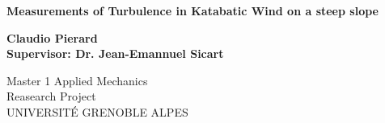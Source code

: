 
\begin{titlepage}
	
	
	\thispagestyle{frontpage}
	
	\begin{center}
		
		\vspace*{8\baselineskip}
	
		
		{\Huge \textbf{Measurements of Turbulence in Katabatic Wind on a steep slope\\}}
		
		
        \vspace*{1,5\baselineskip}

		\large{\textbf{Claudio Pierard}}\\
		\large{\textbf{Supervisor: Dr. Jean-Emannuel Sicart}}\\
		
		\vspace{1,5\baselineskip}
		
		\large{Master 1 Applied Mechanics}\\
		\large{Reasearch Project}\\
		
		\vspace{1,5\baselineskip}
		\large{UNIVERSITÉ GRENOBLE ALPES}\\

	\end{center}
	
\end{titlepage}